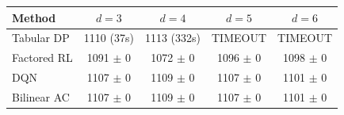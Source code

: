 \begin{tabular}{lcccc}
\toprule
Method & $d=3$ & $d=4$ & $d=5$ & $d=6$ \\
\midrule
Tabular DP & 1110 (37s) & 1113 (332s) & TIMEOUT & TIMEOUT \\
Factored RL & 1091 $\pm$ 0 & 1072 $\pm$ 0 & 1096 $\pm$ 0 & 1098 $\pm$ 0 \\
DQN & 1107 $\pm$ 0 & 1109 $\pm$ 0 & 1107 $\pm$ 0 & 1101 $\pm$ 0 \\
Bilinear AC & 1107 $\pm$ 0 & 1109 $\pm$ 0 & 1107 $\pm$ 0 & 1101 $\pm$ 0 \\
\bottomrule
\end{tabular}